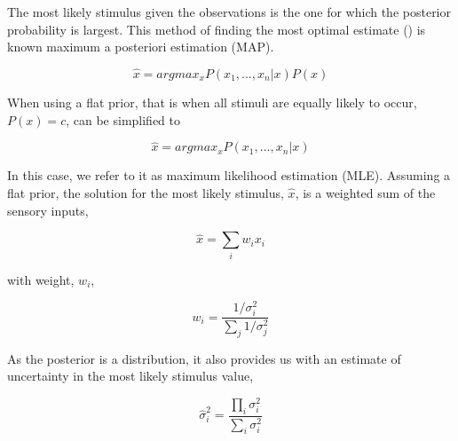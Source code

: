 The  most likely stimulus given the observations is  the one for which the posterior probability is largest. This method of finding the most optimal estimate () is known maximum a posteriori estimation (MAP).

\begin{equation}
\hat{x} = argmax_x P(x_1,...,x_n|x)P(x)
\label{intro:eq:map}
\end{equation}

When using a flat prior, that is when all stimuli are equally likely to occur, $P(x)=c$,  can be simplified to

\begin{equation}
\hat{x} = argmax_x P(x_1,...,x_n|x)
\label{intro:eq:mle}
\end{equation}

In this case, we refer to it as maximum  likelihood estimation (MLE). Assuming a flat prior, the solution for the  most likely stimulus, $\hat{x}$, is a weighted sum of the sensory inputs,

\begin{equation}
\hat{x}=\sum_i w_i x_i
\end{equation}

with weight, $w_i$,

\begin{equation}
w_i = \frac{1/\sigma^2_i}{\sum_j 1/\sigma^2_j}
\end{equation}

As the posterior is a distribution, it also provides us with an estimate of uncertainty in  the most likely stimulus value,

\begin{equation}
\hat{\sigma}^2_i = \frac{\prod_i \sigma^2_i}{\sum_i \sigma^2_i}
\end{equation}



